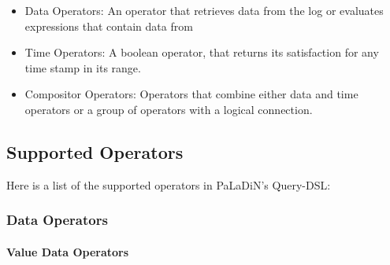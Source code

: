 \documentclass[sigconf,review]{acmart}
\begin{document}
    \begin{itemize}
        \item Data Operators: An operator that retrieves data from the log or evaluates expressions that contain data from
        \item Time Operators: A boolean operator, that returns its satisfaction for any time stamp in its range.
        \item Compositor Operators: Operators that combine either data and time operators or a group of operators with a logical connection.
    \end{itemize}

    \subsection{Supported Operators}

    Here is a list of the supported operators in PaLaDiN's Query-DSL:

    \subsubsection{Data Operators}

    \paragraph{Value Data Operators}
\end{document}
